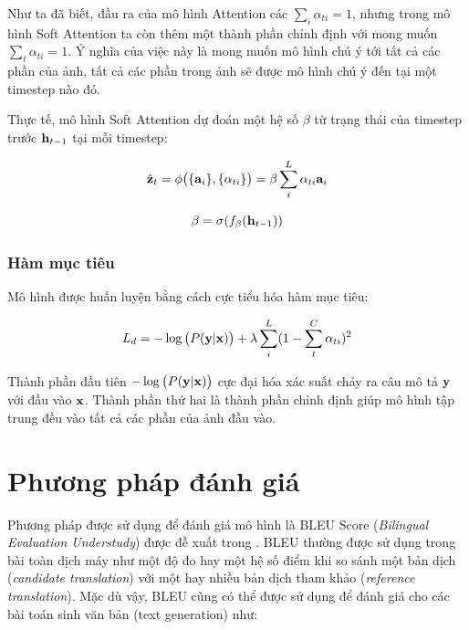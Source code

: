 \documentclass[14pt, a4paper]{article}
\numberwithin{equation}{section}
\numberwithin{algorithm}{section}
\numberwithin{figure}{section}
\numberwithin{dl}{section}
\numberwithin{md}{section}
\numberwithin{bd}{section}
\numberwithin{dn}{section}
\numberwithin{hq}{section}
\begin{document}
    Như ta đã biết, đầu ra của mô hình Attention các $\sum_i \alpha_{ti}=1$, nhưng trong mô hình Soft Attention ta còn thêm một thành phần chỉnh định với mong muốn $\sum_{t} \alpha_{ti}=1$.
    Ý nghĩa của việc này là mong muốn mô hình chú ý tới tất cả các phần của ảnh, tất cả các phần trong ảnh sẽ được mô hình chú ý đến tại một timestep nào đó.

    Thực tế, mô hình Soft Attention dự đoán một hệ số $\beta$ từ trạng thái của timestep trước $\bold{h}_{t-1}$ tại mỗi timestep:
    
    \begin{equation}
        \hat{\bold{z}}_t=\phi\big( \lbrace \bold{a}_i \rbrace, \lbrace \alpha_{ti} \rbrace \big)=\beta \sum_{i}^L \alpha_{ti} \bold{a}_i
    \end{equation}

    \begin{equation}
        \beta = \sigma(f_{\beta}(\bold{h}_{t-1}))
    \end{equation}

    \subsubsection{Hàm mục tiêu}

    Mô hình được huấn luyện bằng cách cực tiểu hóa hàm mục tiêu:

    \begin{equation}
        L_d=-\log\big( P(\bold{y} \vert \bold{x}) \big) + \lambda \sum_i^L (1-\sum_t^C \alpha_{ti})^2
    \end{equation}

    
    Thành phần đầu tiên $-\log\big( P(\bold{y} \vert \bold{x}) \big)$ cực đại hóa xác suất chảy ra câu mô tả $\bold{y}$ với đầu vào $\bold{x}$. 
    Thành phần thứ hai là thành phần chỉnh định giúp mô hình tập trung đều vào tất cả các phần của ảnh đầu vào.

    \section{Phương pháp đánh giá}

    Phương pháp được sử dụng để đánh giá mô hình là BLEU Score (\textit{Bilingual Evaluation Understudy}) được đề xuất trong \cite{papineni2002bleu}.
    BLEU thường được sử dụng trong bài toàn dịch máy như một độ đo hay một hệ số điểm khi so sánh một bản dịch (\textit{candidate translation}) với một hay nhiều bản dịch tham khảo (\textit{reference translation}). Mặc dù vậy, BLEU cũng có thể được sử dụng để đánh giá cho các bài toán sinh văn bản (text generation) như:
\end{document}
